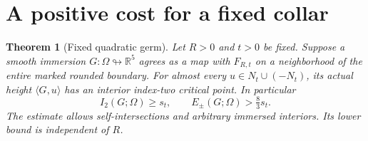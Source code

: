 \documentclass[11pt,letterpaper]{article}
\numberwithin{equation}{section}
\newtheorem{theorem}{Theorem}[section]
\theoremstyle{definition}
\begin{document}
\section{A positive cost for a fixed collar}\label{sec:fixed}

\begin{theorem}[Fixed quadratic germ]\label{thm:fixed}
Let \(R>0\) and \(t>0\) be fixed. Suppose a smooth immersion
\(G:\Omega\looparrowright\mathbb R^5\) agrees as a map with
\(F_{R,t}\) on a neighborhood of the entire marked rounded boundary.
For almost every \(u\in N_t\cup(-N_t)\), its actual height
\(\langle G,u\rangle\) has an interior index-two critical point.
In particular
\[
                   I_2(G;\Omega)\ge s_t,\qquad
                   E_\pm(G;\Omega)>\tfrac83 s_t .
\]
The estimate allows self-intersections and arbitrary immersed
interiors. Its lower bound is independent of \(R\).
\end{theorem}
\end{document}

